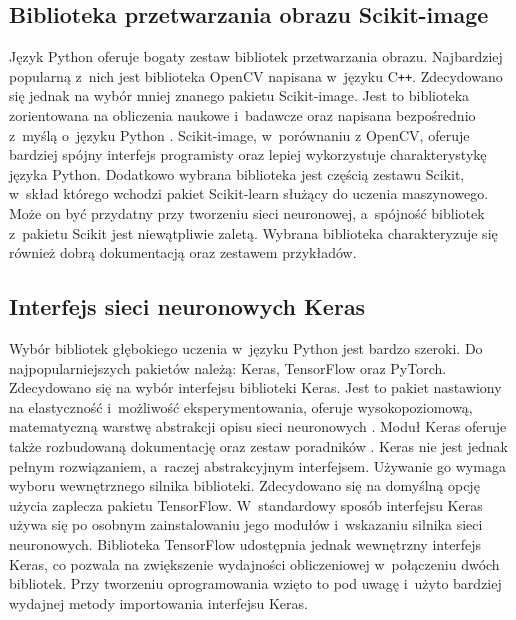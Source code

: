 \subsection{Biblioteka przetwarzania obrazu Scikit-image}
Język Python oferuje bogaty zestaw bibliotek przetwarzania obrazu.
Najbardziej popularną z~nich jest biblioteka OpenCV napisana w~języku
C\texttt{++}.
Zdecydowano się jednak na wybór mniej znanego pakietu Scikit-image.
Jest to biblioteka zorientowana na obliczenia naukowe i~badawcze
oraz napisana bezpośrednio z~myślą o~języku Python \cite{scikit-image}.
Scikit-image, w~porównaniu z OpenCV, oferuje bardziej spójny interfejs
programisty oraz lepiej wykorzystuje charakterystykę języka Python.
Dodatkowo wybrana biblioteka jest częścią zestawu Scikit, w~skład
którego wchodzi pakiet Scikit-learn służący do uczenia maszynowego.
Może on być przydatny przy tworzeniu sieci neuronowej, a~spójność bibliotek
z~pakietu Scikit jest niewątpliwie zaletą.
Wybrana biblioteka charakteryzuje się również dobrą dokumentacją
\cite{scikit_reference} oraz zestawem przykładów.

\subsection{Interfejs sieci neuronowych Keras}
\label{subsec:software_network}
Wybór bibliotek głębokiego uczenia w~języku Python jest bardzo szeroki.
Do najpopularniejszych pakietów należą: Keras, TensorFlow oraz PyTorch.
Zdecydowano się na wybór interfejsu biblioteki Keras.
Jest to pakiet nastawiony na elastyczność i~możliwość eksperymentowania,
oferuje wysokopoziomową, matematyczną warstwę abstrakcji opisu sieci
neuronowych \cite{chollet_keras}.
Moduł Keras oferuje także rozbudowaną dokumentację oraz zestaw poradników
\cite{keras_docs}.
Keras nie jest jednak pełnym rozwiązaniem, a~raczej abstrakcyjnym interfejsem.
Używanie go wymaga wyboru wewnętrznego silnika biblioteki.
Zdecydowano się na domyślną opcję użycia zaplecza pakietu TensorFlow.
W~standardowy sposób interfejsu Keras używa się po osobnym zainstalowaniu
jego modułów i~wskazaniu silnika sieci neuronowych.
Biblioteka TensorFlow udostępnia jednak wewnętrzny interfejs Keras,
co pozwala na zwiększenie wydajności obliczeniowej w~połączeniu dwóch
bibliotek.
Przy tworzeniu oprogramowania wzięto to pod uwagę i~użyto bardziej wydajnej
metody importowania interfejsu Keras.

